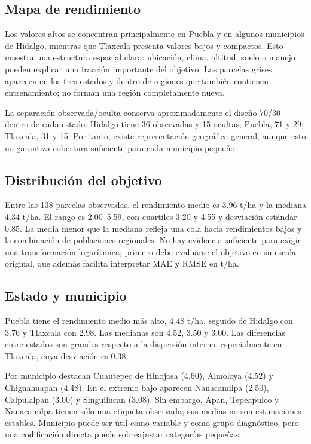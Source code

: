 \documentclass[11pt,a4paper]{article}
\begin{document}
\subsection{Mapa de rendimiento}
Los valores altos se concentran principalmente en Puebla y en algunos municipios
de Hidalgo, mientras que Tlaxcala presenta valores bajos y compactos. Esto muestra
una estructura espacial clara: ubicación, clima, altitud, suelo o manejo pueden
explicar una fracción importante del objetivo. Las parcelas grises aparecen en
los tres estados y dentro de regiones que también contienen entrenamiento; no
forman una región completamente nueva.

La separación observada/oculta conserva aproximadamente el diseño 70/30 dentro
de cada estado: Hidalgo tiene 36 observadas y 15 ocultas; Puebla, 71 y 29;
Tlaxcala, 31 y 15. Por tanto, existe representación geográfica general, aunque
esto no garantiza cobertura suficiente para cada municipio pequeño.

\subsection{Distribución del objetivo}
Entre las 138 parcelas observadas, el rendimiento medio es 3.96 t/ha y la mediana
4.34 t/ha. El rango es 2.00--5.59, con cuartiles 3.20 y 4.55 y desviación estándar
0.85. La media menor que la mediana refleja una cola hacia rendimientos bajos y
la combinación de poblaciones regionales. No hay evidencia suficiente para exigir
una transformación logarítmica; primero debe evaluarse el objetivo en su escala
original, que además facilita interpretar MAE y RMSE en t/ha.

\subsection{Estado y municipio}
Puebla tiene el rendimiento medio más alto, 4.48 t/ha, seguido de Hidalgo con
3.76 y Tlaxcala con 2.98. Las medianas son 4.52, 3.50 y 3.00. Las diferencias
entre estados son grandes respecto a la dispersión interna, especialmente en
Tlaxcala, cuya desviación es 0.38.

Por municipio destacan Cuautepec de Hinojosa (4.60), Almoloya (4.52) y
Chignahuapan (4.48). En el extremo bajo aparecen Nanacamilpa (2.50), Calpulalpan
(3.00) y Singuilucan (3.08). Sin embargo, Apan, Tepeapulco y Nanacamilpa tienen
sólo una etiqueta observada; sus medias no son estimaciones estables. Municipio
puede ser útil como variable y como grupo diagnóstico, pero una codificación
directa puede sobreajustar categorías pequeñas.
\end{document}

